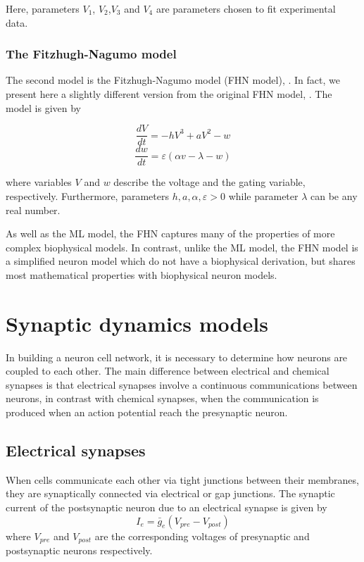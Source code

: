 Here, parameters $V_{1}$, $V_{2}$,$V_{3}$ and $V_{4}$ are parameters chosen to fit experimental data.

\subsubsection{The Fitzhugh-Nagumo model}
The second model is the Fitzhugh-Nagumo model (FHN model), \cite{Rot}. In fact, we present here a slightly different version from the original FHN model, \cite{4066548,Fitzhugh1960}. The model is given by 

\begin{equation}
    \frac{dV}{dt} = -hV^{3} + aV^{2} - w
\end{equation}
\begin{equation}
    \frac{dw}{dt} = \varepsilon(\alpha v-\lambda-w)
\end{equation}

where variables $V$ and $w$ describe the voltage and the gating variable, respectively. Furthermore,  parameters $h,a,\alpha, \varepsilon >0$ while parameter $\lambda$ can be any real number.

As well as the ML model, the FHN captures many of the properties of more complex biophysical models. In contrast, unlike the ML model, the FHN model is a simplified neuron model which do not have a biophysical derivation, but shares most mathematical properties with biophysical neuron models.

\section{Synaptic dynamics models}
In building a neuron cell network, it is necessary to determine how neurons are coupled to each other. The main difference between electrical and chemical synapses is that electrical synapses involve a continuous communications between neurons, in contrast with chemical synapses, when the communication is produced when an action potential reach the presynaptic neuron.

\subsection{Electrical synapses}
When cells communicate each other via tight junctions between their membranes, they are synaptically connected via electrical or gap junctions. The synaptic current of the postsynaptic neuron due to an electrical synapse is given by
\begin{equation}
    I_{e} = \bar{g}_{e}(V_{pre}-V_{post})
\end{equation}
where $V_{pre}$ and $V_{post}$ are the corresponding voltages of presynaptic and postsynaptic neurons respectively.

